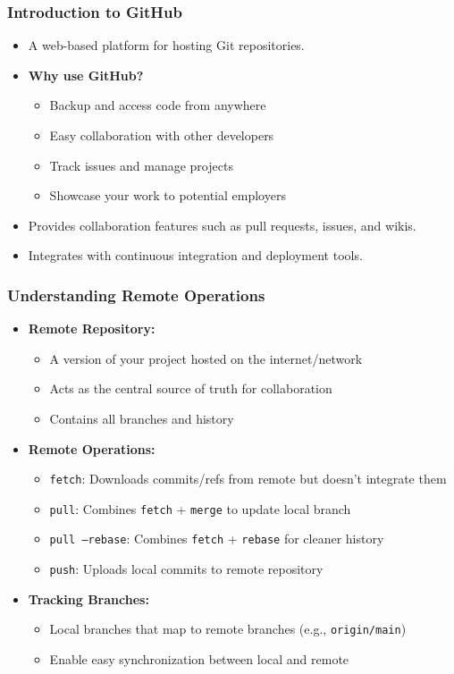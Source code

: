 \documentclass[10pt]{beamer}
\begin{document}
\begin{frame}
    \frametitle{Introduction to GitHub}
    \begin{itemize}
        \item A web-based platform for hosting Git repositories.
        \item \textbf{Why use GitHub?}
        \begin{itemize}
            \item Backup and access code from anywhere
            \item Easy collaboration with other developers
            \item Track issues and manage projects
            \item Showcase your work to potential employers
        \end{itemize}
        \item Provides collaboration features such as pull requests, issues, and wikis.
        \item Integrates with continuous integration and deployment tools.
    \end{itemize}
\end{frame}

\begin{frame}
    \frametitle{Understanding Remote Operations}
    \begin{itemize}
        \item \textbf{Remote Repository:}
        \begin{itemize}
            \item A version of your project hosted on the internet/network
            \item Acts as the central source of truth for collaboration
            \item Contains all branches and history
        \end{itemize}
        \vspace{0.3em}
        \item \textbf{Remote Operations:}
        \begin{itemize}
            \item \texttt{fetch}: Downloads commits/refs from remote but doesn't integrate them
            \item \texttt{pull}: Combines \texttt{fetch} + \texttt{merge} to update local branch
            \item \texttt{pull --rebase}: Combines \texttt{fetch} + \texttt{rebase} for cleaner history
            \item \texttt{push}: Uploads local commits to remote repository
        \end{itemize}
        \vspace{0.3em}
        \item \textbf{Tracking Branches:}
        \begin{itemize}
            \item Local branches that map to remote branches (e.g., \texttt{origin/main})
            \item Enable easy synchronization between local and remote
        \end{itemize}
    \end{itemize}
\end{frame}
\end{document}
